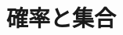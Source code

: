 \documentclass[../../topic_probability-statistics]{subfiles}
\begin{document}
\chapter{確率と集合}



\end{document}
